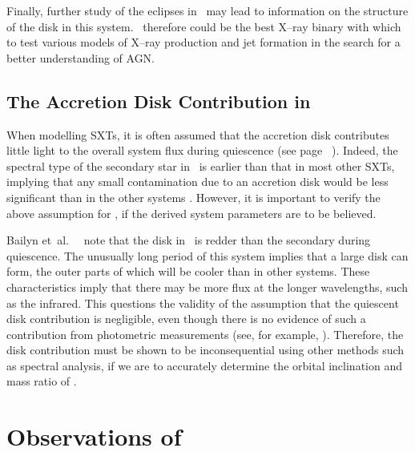 Finally, further study of the eclipses in \groj\ may lead to information on the
structure of the disk in this system. \groj\ therefore could be the best X--ray binary with which to test
various models of X--ray production and jet formation in the search for
a better understanding of AGN. %


\subsection{The Accretion Disk Contribution in \groj}
\label{cha:GROJ1655-40:sec:IntroductionToJ1655:subsec:TheAccretionDisk}

When modelling SXTs, it is often assumed that the accretion disk
contributes little light to the overall system flux during
quiescence (see page~%
\pageref{cha:InfraredDataReductionTechniques:sec:InfraredAstronomy:subsubsec:InfraredSpectroscopy}%
). Indeed, the spectral type of the secondary star in \groj\ is earlier than that in most other SXTs, implying that any small
contamination due to an accretion disk would be less significant than
in the other systems %
\cite{BeerPodsiadlowski:2001}%
. However, it is important to verify the above assumption for \groj, if the derived
system parameters are to be believed. %

\vspace{\myparskip}

Bailyn et~al.\ %
\citeyear{BailynJain_et_al.:1998}%
\ note that the disk in \groj\ is redder than the secondary during
quiescence. The unusually long period of this system implies that a
large disk can form, the outer parts of which will be cooler than in
other systems. These characteristics imply that there may
be more flux at the longer wavelengths, such as the infrared. This questions the validity of the
assumption that the quiescent disk contribution is negligible, even though there is no evidence of such a contribution from photometric measurements (see, for example, %
%
). Therefore, the
disk contribution must be shown to be inconsequential using other
methods such as spectral analysis, if we are to accurately determine
the orbital inclination and mass ratio of \groj. %


\section{Observations of \groj}
\label{cha:GROJ1655-40:sec:ObservationsOfJ1655}

